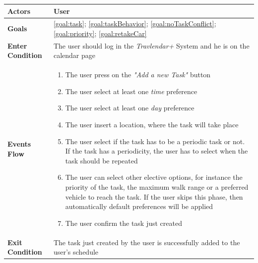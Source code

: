 \begin{table}[H]
	\centering
    
    \begin{tabular}{|p{3.5cm}|p{10.3cm}|}
    
    \hline
    \textbf{\large{Actors}}  			& \tabitem User\\
    
    \hline
    \textbf{\large{Goals}} 				& \ref{goal:task}; \ref{goal:taskBehavior}; \ref{goal:noTaskConflict}; \ref{goal:priority}; \ref{goal:retakeCar}\\
    
    \hline
    \textbf{\large{Enter Condition}}	& The user should log in the \emph{Travlendar+} System and he 												is on the calendar page\\
    
    \hline
    \textbf{\large{Events Flow}}		& \begin{enumerate}[leftmargin=0.5cm]
                                          	\item The user press on the \emph{"Add a new Task"} button
                                            \item The user select at least one \emph{time} preference
                                            \item The user select at least one \emph{day} preference
                                            \item The user insert a location, where the task will take place
                                            \item The user select if the task has to be a periodic task 														or not. If the task has a periodicity, the user has to 															select when the task should be repeated
                                            \item The user can select other elective options, for instance the priority of the task, the maximum walk range or a preferred vehicle to reach the task. If the user skips this phase, then automatically default preferences will be applied
                                            \item The user confirm the task just created
                                          \end{enumerate}
    										\\
    \hline
    \textbf{\large{Exit Condition}} 	& The task just created by the user is successfully added to the user's 											schedule\\
    

\end{tabular}
\end{table}
